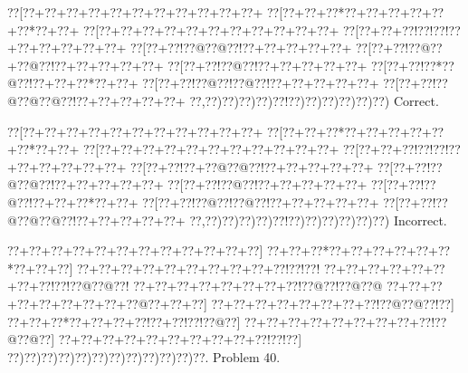 \documentclass[a5paper]{article}
\begin{document}
\begin{center}
{\goo
\0??[\0??+\0??+\0??+\0??+\0??+\0??+\0??+\0??+\0??+\0??+\0??+
\0??[\0??+\0??+\0??*\0??+\0??+\0??+\0??+\0??+\0??*\0??+\0??+
\0??[\0??+\0??+\0??+\0??+\0??+\0??+\0??+\0??+\0??+\0??+\0??+
\0??[\0??+\0??+\0??!\0??!\0??!\0??+\0??+\0??+\0??+\0??+\0??+
\0??[\0??+\0??!\0??@\0??@\0??!\0??+\0??+\0??+\0??+\0??+
\0??[\0??+\0??!\0??@\0??+\0??@\0??!\0??+\0??+\0??+\0??+\0??+
\0??[\0??+\0??!\0??@\0??!\0??+\0??+\0??+\0??+\0??+
\0??[\0??+\0??!\0??*\0??@\0??!\0??+\0??+\0??*\0??+\0??+
\0??[\0??+\0??!\0??@\0??!\0??@\0??!\0??+\0??+\0??+\0??+\0??+
\0??[\0??+\0??!\0??@\0??@\0??@\0??!\0??+\0??+\0??+\0??+\0??+
\0??,\0??)\0??)\0??)\0??)\0??!\0??)\0??)\0??)\0??)\0??)\0??)
}
Correct. 

\end{center}
\begin{center}
{\goo
\0??[\0??+\0??+\0??+\0??+\0??+\0??+\0??+\0??+\0??+\0??+\0??+
\0??[\0??+\0??+\0??*\0??+\0??+\0??+\0??+\0??+\0??*\0??+\0??+
\0??[\0??+\0??+\0??+\0??+\0??+\0??+\0??+\0??+\0??+\0??+\0??+
\0??[\0??+\0??+\0??!\0??!\0??!\0??+\0??+\0??+\0??+\0??+\0??+
\0??[\0??+\0??!\0??+\0??@\0??@\0??!\0??+\0??+\0??+\0??+\0??+
\0??[\0??+\0??!\0??@\0??@\0??!\0??+\0??+\0??+\0??+\0??+
\0??[\0??+\0??!\0??@\0??!\0??+\0??+\0??+\0??+\0??+
\0??[\0??+\0??!\0??@\0??!\0??+\0??+\0??*\0??+\0??+
\0??[\0??+\0??!\0??@\0??!\0??@\0??!\0??+\0??+\0??+\0??+\0??+
\0??[\0??+\0??!\0??@\0??@\0??@\0??!\0??+\0??+\0??+\0??+\0??+
\0??,\0??)\0??)\0??)\0??)\0??!\0??)\0??)\0??)\0??)\0??)\0??)
}
Incorrect. 

\end{center}
\newpage
\begin{center}
{\goo
\0??+\0??+\0??+\0??+\0??+\0??+\0??+\0??+\0??+\0??+\0??+\0??]
\0??+\0??+\0??*\0??+\0??+\0??+\0??+\0??+\0??*\0??+\0??+\0??]
\0??+\0??+\0??+\0??+\0??+\0??+\0??+\0??+\0??+\0??!\0??!\0??!
\0??+\0??+\0??+\0??+\0??+\0??+\0??+\0??!\0??!\0??@\0??@\0??!
\0??+\0??+\0??+\0??+\0??+\0??+\0??+\0??!\0??@\0??!\0??@\0??@
\0??+\0??+\0??+\0??+\0??+\0??+\0??+\0??+\0??@\0??+\0??+\0??]
\0??+\0??+\0??+\0??+\0??+\0??+\0??+\0??!\0??@\0??@\0??!\0??]
\0??+\0??+\0??*\0??+\0??+\0??+\0??!\0??+\0??!\0??!\0??@\0??]
\0??+\0??+\0??+\0??+\0??+\0??+\0??+\0??+\0??!\0??@\0??@\0??]
\0??+\0??+\0??+\0??+\0??+\0??+\0??+\0??+\0??+\0??!\0??!\0??]
\0??)\0??)\0??)\0??)\0??)\0??)\0??)\0??)\0??)\0??)\0??)\0??.
}
Problem 40.

\end{center}
\end{document}
